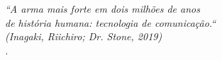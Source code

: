 \begin{epigrafe}
    \vspace*{\fill}
	\begin{flushright}
		\textit{``A arma mais forte em dois milhões de anos\\
		de história humana: tecnologia de comunicação.`` \\
		(Inagaki, Riichiro; Dr. Stone, 2019)\\.}
	\end{flushright}
\end{epigrafe}